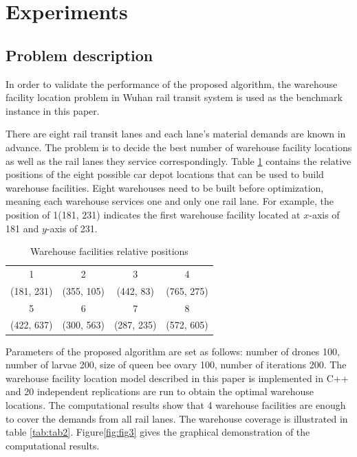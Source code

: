 \section{Experiments}
\subsection{Problem description}
In order to validate the performance of the proposed algorithm, the warehouse facility location problem in Wuhan rail transit system is used as the benchmark instance in this paper.

There are eight rail transit lanes and each lane's material demands are known in advance.
The problem is to decide the best number of warehouse facility locations as well as the rail lanes they service correspondingly.
Table \ref{tab:tab1} contains the relative positions of the eight possible car depot locations that can be used to build warehouse facilities.
Eight warehouses need to be built before optimization, meaning each warehouse services one and only one rail lane.
For example, the position of 1(181, 231) indicates the first warehouse facility located at $x$-axis of 181 and $y$-axis of 231.

\begin{table}[h!]
	\begin{center}
		\caption{Warehouse facilities relative positions}
		\label{tab:tab1}
		\begin{tabular}{cccc}
			\hline
			1 & 2 & 3 & 4 \\
			(181, 231) & (355, 105) & (442, 83) & (765, 275) \\
			\hline
			5 & 6 & 7 & 8 \\ 
			(422, 637) & (300, 563) & (287, 235) & (572, 605)\\
			\hline
		\end{tabular}
	\end{center}
\end{table}



Parameters of the proposed algorithm are set as follows: number of drones 100, number of larvae 200, size of queen bee ovary 100, number of iterations 200.
The warehouse facility location model described in this paper is implemented in C++ and 20 independent replications are run to obtain the optimal warehouse locations.
The computational results show that 4 warehouse facilities are enough to cover the demands from all rail lanes.
The warehouse coverage is illustrated in table \ref{tab:tab2}.
Figure\ref{fig:fig3} gives the graphical demonstration of the computational results.

